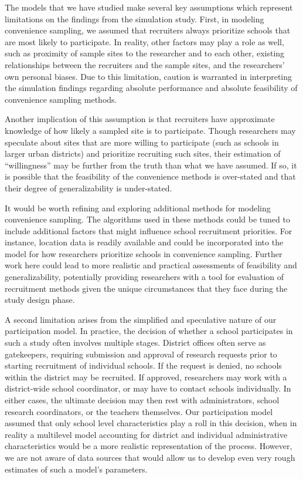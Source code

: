 \documentclass[
  english,
  man,floatsintext]{apa6}
\begin{document}
The models that we have studied make several key assumptions which represent limitations on the findings from the simulation study. First, in modeling convenience sampling, we assumed that recruiters always prioritize schools that are most likely to participate. In reality, other factors may play a role as well, such as proximity of sample sites to the researcher and to each other, existing relationships between the recruiters and the sample sites, and the researchers' own personal biases.
Due to this limitation, caution is warranted in interpreting the simulation findings regarding absolute performance and absolute feasibility of convenience sampling methods.

Another implication of this assumption is that recruiters have approximate knowledge of how likely a sampled site is to participate. Though researchers may speculate about sites that are more willing to participate (such as schools in larger urban districts) and prioritize recruiting such sites, their estimation of ``willingness'' may be further from the truth than what we have assumed. If so, it is possible that the feasibility of the convenience methods is over-stated and that their degree of generalizability is under-stated.

It would be worth refining and exploring additional methods for modeling convenience sampling. The algorithms used in these methods could be tuned to include additional factors that might influence school recruitment priorities. For instance, location data is readily available and could be incorporated into the model for how researchers prioritize schools in convenience sampling. Further work here could lead to more realistic and practical assessments of feasibility and generalizability, potentially providing researchers with a tool for evaluation of recruitment methods given the unique circumstances that they face during the study design phase.

A second limitation arises from the simplified and speculative nature of our participation model. In practice, the decision of whether a school participates in such a study often involves multiple stages. District offices often serve as gatekeepers, requiring submission and approval of research requests prior to starting recruitment of individual schools. If the request is denied, no schools within the district may be recruited. If approved, researchers may work with a district-wide school coordinator, or may have to contact schools individually. In either cases, the ultimate decision may then rest with administrators, school research coordinators, or the teachers themselves. Our participation model assumed that only school level characteristics play a roll in this decision, when in reality a multilevel model accounting for district and individual administrative characteristics would be a more realistic representation of the process. However, we are not aware of data sources that would allow us to develop even very rough estimates of such a model's parameters.
\end{document}
